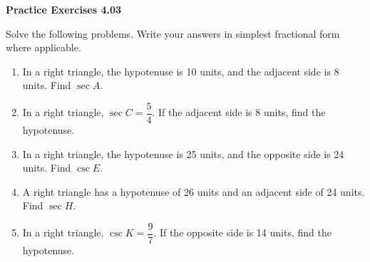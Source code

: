 \vspace{0.3ex}
\noindent\textbf{Practice Exercises 4.03}

\vspace{0.2ex}

Solve the following problems. Write your answers in simplest fractional form where applicable.

\begin{enumerate}
    \item In a right triangle, the hypotenuse is 10 units, and the adjacent side is 8 units. Find $\sec A$.
    \item In a right triangle, $\sec C = \dfrac{5}{4}$. If the adjacent side is 8 units, find the hypotenuse.
    \item In a right triangle, the hypotenuse is 25 units, and the opposite side is 24 units. Find $\csc E$.
    \item A right triangle has a hypotenuse of 26 units and an adjacent side of 24 units. Find $\sec H$.
    \item In a right triangle, $\csc K = \dfrac{9}{7}$. If the opposite side is 14 units, find the hypotenuse.
\end{enumerate}
